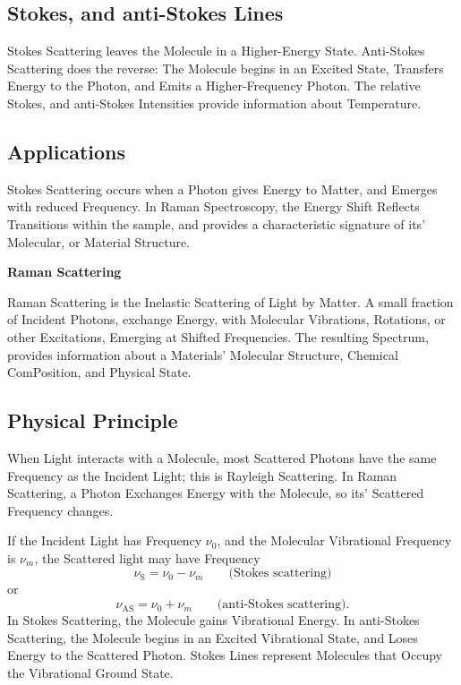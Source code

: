 \documentclass[a4paper, 10pt, onepage]{elegantbook}
\begin{document}
{\subsection{Stokes, and anti-Stokes Lines}

\noindent

Stokes Scattering leaves the Molecule in a Higher-Energy State. Anti-Stokes Scattering does the reverse: The Molecule 
begins in an Excited State, Transfers Energy to the Photon, and Emits a Higher-Frequency Photon. The relative Stokes, 
and anti-Stokes Intensities provide information about Temperature.  

\subsection{Applications}

\noindent

Stokes Scattering occurs when a Photon gives Energy to Matter, and Emerges with reduced Frequency. In Raman 
Spectroscopy, the Energy Shift Reflects Transitions within the sample, and provides a characteristic signature of its' 
Molecular, or Material Structure.  

\noindent

    \textbf{Raman Scattering}

\noindent

Raman Scattering is the Inelastic Scattering of Light by Matter. A small fraction of Incident Photons, exchange Energy, 
with Molecular Vibrations, Rotations, or other Excitations, Emerging at Shifted Frequencies. The resulting Spectrum, 
provides information about a Materials' Molecular Structure, Chemical ComPosition, and Physical
State.  

\subsection{Physical Principle}

\noindent

When Light interacts with a Molecule, most Scattered Photons have the same Frequency as the Incident Light; this is 
Rayleigh Scattering. In Raman Scattering, a Photon Exchanges Energy with the Molecule, so its' Scattered Frequency 
changes.  

If the Incident Light has Frequency $\nu_0$, and the Molecular
Vibrational Frequency is $\nu_m$, the Scattered light may have Frequency
\begin{equation}
  \nu_{\mathrm{S}} = \nu_0-\nu_m
  \qquad\text{(Stokes scattering)}
\end{equation}
or
\begin{equation}
  \nu_{\mathrm{AS}} = \nu_0+\nu_m
  \qquad\text{(anti-Stokes scattering)}.
\end{equation}
In Stokes Scattering, the Molecule gains Vibrational Energy. In anti-Stokes Scattering, the Molecule begins in an 
Excited Vibrational State, and Loses Energy to the Scattered Photon. Stokes Lines represent Molecules that Occupy the 
Vibrational Ground State.  

}
\end{document}
